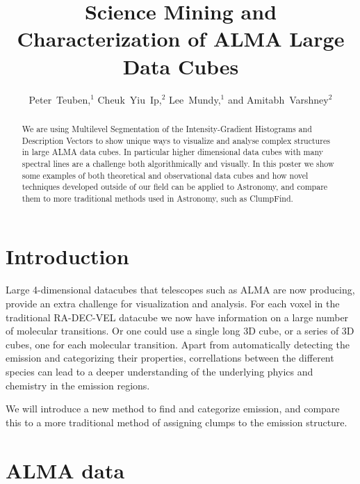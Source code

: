 
\resetcounters


\title{Science Mining and Characterization of ALMA Large Data Cubes}
\author{Peter~Teuben,$^1$ Cheuk~Yiu~Ip,$^2$ Lee~Mundy,$^1$ and Amitabh~Varshney$^2$
}


\begin{abstract}

We are using Multilevel Segmentation of the Intensity-Gradient
Histograms and Description Vectors to show unique ways to visualize
and analyse complex structures in large ALMA data cubes. In particular
higher dimensional data cubes with many spectral lines are a challenge
both algorithmically and visually. In this poster we show some examples
of both theoretical and observational data cubes and how novel
techniques developed outside of our field can be applied to Astronomy,
and compare them to more traditional methods used in Astronomy,
such as ClumpFind.

\end{abstract}

\section{Introduction}

Large 4-dimensional datacubes that telescopes such as ALMA are now producing,
provide an extra challenge for visualization and analysis. For each voxel in
the traditional RA-DEC-VEL datacube we now have information on a large number
of molecular transitions. Or one could use a single long 3D cube, or a series
of 3D cubes, one for each molecular transition.
Apart from automatically detecting the emission
and categorizing their properties, correllations between the different species
can lead to a deeper understanding of the underlying phyics and chemistry
in the emission regions.

We will introduce a new method to find and categorize emission, and
compare this to a more traditional method of assigning clumps to the
emission structure.

\section{ALMA data}

